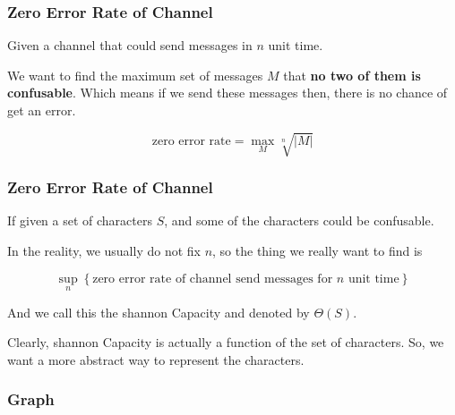       \begin{frame}
            \frametitle{Zero Error Rate of Channel}
            \begin{definition}
                  Given a channel that could send messages in $n$ unit time.

                  We want to find the maximum set of messages $M$ that \textbf{no two of them is confusable}.
                  Which means if we send these messages then, there is no chance of get an error.

                  \begin{equation}
                        \text{zero error rate} = \max_{M} \sqrt[n]{|M|}
                  \end{equation}
            \end{definition}
      \end{frame}

      \begin{frame}
            \frametitle{Zero Error Rate of Channel}
            
            \begin{definition}
                  If given a set of characters $S$, and some of the characters could be confusable.

                  In the reality, we usually do not fix $n$, so the thing we really want to find is
                  
                  \begin{equation}
                        \sup_{n} \left\{
                              \text{zero error rate of channel send messages for $n$ unit time}
                        \right\}
                  \end{equation}

                  And we call this the shannon Capacity and denoted by $\Theta(S)$.
            \end{definition}

            Clearly, shannon Capacity is actually a function of the set of characters. So, we want a more abstract way to represent the characters.
      \end{frame}

\subsubsection*{Graph}

